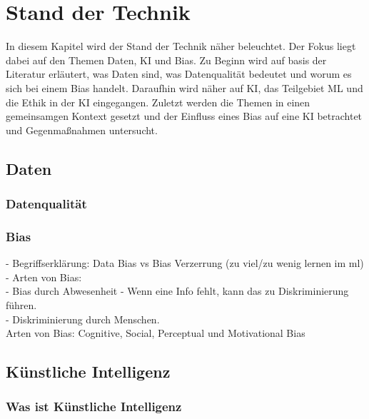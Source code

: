 \chapter{Stand der Technik}
    \begin{onehalfspace}  
        \label{sec:theorie/standdertechnik}
            In diesem Kapitel wird der Stand der Technik näher beleuchtet. Der Fokus liegt dabei auf den Themen Daten, \ac*{KI} und Bias. Zu Beginn wird auf basis der Literatur erläutert, was Daten sind, was Datenqualität bedeutet und worum es sich bei einem Bias handelt. Daraufhin wird näher auf \ac*{KI}, das Teilgebiet \ac*{ML} und die Ethik in der \ac*{KI} eingegangen. Zuletzt werden die Themen in einen gemeinsamgen Kontext gesetzt und der Einfluss eines Bias auf eine \ac*{KI} betrachtet und Gegenmaßnahmen untersucht. 
        
        \section{Daten}
        \label{subsec:daten}
        
        \subsection{Datenqualität}
        \label{subsubsec:datenqualität}

        \subsection{Bias}
        \label{subsubsec:Bias}
            -   Begriffserklärung: Data Bias vs Bias Verzerrung (zu viel/zu wenig lernen im ml)\\
            -   Arten von Bias: \\
                -   Bias durch Abwesenheit - Wenn eine Info fehlt, kann das zu Diskriminierung führen. \\
                -   Diskriminierung durch Menschen. \\
            Arten von Bias: Cognitive, Social, Perceptual und Motivational Bias \cite{8768554}
 
        \section{Künstliche Intelligenz}
        \label{subsec:KIandML}

        \subsection{Was ist Künstliche Intelligenz}
        \label{subsec:wasistKI}


\end{onehalfspace}
